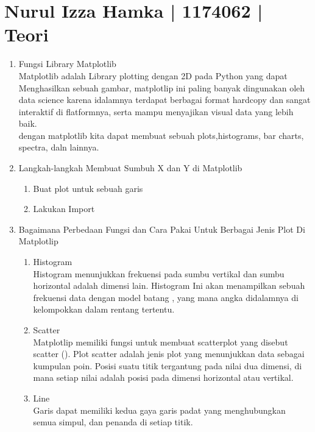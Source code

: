 \section{Nurul Izza Hamka | 1174062 | Teori}
\begin{enumerate}

\item Fungsi Library Matplotlib\\

Matplotlib adalah Library plotting dengan 2D pada Python yang dapat Menghasilkan sebuah gambar, 
matplotlip ini paling banyak dingunakan oleh data science karena idalamnya terdapat berbagai format hardcopy dan sangat interaktif di flatformnya, 
serta mampu menyajikan visual data yang lebih baik. \\
dengan matplotlib kita dapat membuat sebuah plots,histograms, bar charts, spectra, daln lainnya.\\

\item Langkah-langkah Membuat Sumbuh X dan Y di Matplotlib

\begin{enumerate}
\item Buat plot untuk sebuah garis
\item Lakukan Import

\end{enumerate}

\item Bagaimana Perbedaan Fungsi dan Cara Pakai Untuk Berbagai Jenis Plot Di Matplotlip

\begin{enumerate}
\item Histogram \\
Histogram menunjukkan frekuensi pada sumbu vertikal dan sumbu horizontal adalah dimensi lain. 
Histogram Ini akan menampilkan sebuah frekuensi data dengan model batang , yang mana angka didalamnya di kelompokkan dalam rentang tertentu.
\item Scatter\\
Matplotlip memiliki fungsi  untuk membuat scatterplot yang disebut scatter (). 
Plot scatter adalah jenis plot yang menunjukkan data sebagai kumpulan poin. Posisi suatu titik tergantung pada nilai dua dimensi, 
di mana setiap nilai adalah posisi pada dimensi horizontal atau vertikal.
\item Line\\
Garis dapat memiliki kedua gaya garis padat yang menghubungkan semua simpul, dan penanda di setiap titik. 
\end{enumerate}


\end{enumerate}
